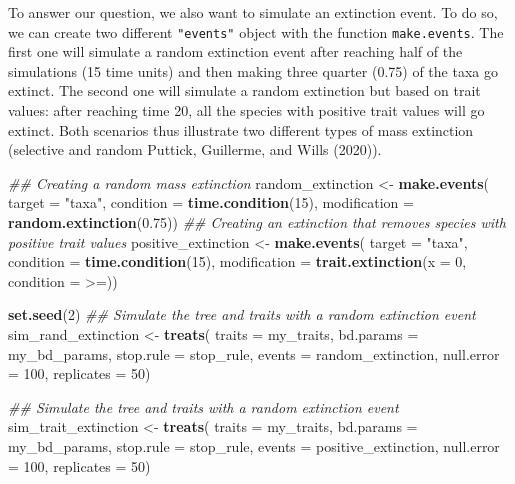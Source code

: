 \documentclass[
]{article}
\newenvironment{Shaded}{\begin{snugshade}}{\end{snugshade}}
\newcommand{\CommentTok}[1]{\textcolor[rgb]{0.56,0.35,0.01}{\textit{#1}}}
\newcommand{\DataTypeTok}[1]{\textcolor[rgb]{0.13,0.29,0.53}{#1}}
\newcommand{\DecValTok}[1]{\textcolor[rgb]{0.00,0.00,0.81}{#1}}
\newcommand{\FloatTok}[1]{\textcolor[rgb]{0.00,0.00,0.81}{#1}}
\newcommand{\KeywordTok}[1]{\textcolor[rgb]{0.13,0.29,0.53}{\textbf{#1}}}
\newcommand{\NormalTok}[1]{#1}
\newcommand{\StringTok}[1]{\textcolor[rgb]{0.31,0.60,0.02}{#1}}
\begin{document}
To answer our question, we also want to simulate an extinction event. To
do so, we can create two different \texttt{"events"} object with the
function \texttt{make.events}. The first one will simulate a random
extinction event after reaching half of the simulations (15 time units)
and then making three quarter (0.75) of the taxa go extinct. The second
one will simulate a random extinction but based on trait values: after
reaching time 20, all the species with positive trait values will go
extinct. Both scenarios thus illustrate two different types of mass
extinction (selective and random Puttick, Guillerme, and Wills (2020)).

\begin{Shaded}
\begin{Highlighting}[]
\CommentTok{\#\# Creating a random mass extinction}
\NormalTok{random\_extinction \textless{}{-}}\StringTok{ }\KeywordTok{make.events}\NormalTok{(}
    \DataTypeTok{target       =} \StringTok{"taxa"}\NormalTok{,}
    \DataTypeTok{condition    =} \KeywordTok{time.condition}\NormalTok{(}\DecValTok{15}\NormalTok{),}
    \DataTypeTok{modification =} \KeywordTok{random.extinction}\NormalTok{(}\FloatTok{0.75}\NormalTok{))}
\CommentTok{\#\# Creating an extinction that removes species with positive trait values}
\NormalTok{positive\_extinction \textless{}{-}}\StringTok{ }\KeywordTok{make.events}\NormalTok{(}
    \DataTypeTok{target =} \StringTok{"taxa"}\NormalTok{,}
    \DataTypeTok{condition =} \KeywordTok{time.condition}\NormalTok{(}\DecValTok{15}\NormalTok{),}
    \DataTypeTok{modification =} \KeywordTok{trait.extinction}\NormalTok{(}\DataTypeTok{x =} \DecValTok{0}\NormalTok{, }\DataTypeTok{condition =} \StringTok{\textasciigrave{}}\DataTypeTok{\textgreater{}=}\StringTok{\textasciigrave{}}\NormalTok{))}

\KeywordTok{set.seed}\NormalTok{(}\DecValTok{2}\NormalTok{)}
\CommentTok{\#\# Simulate the tree and traits with a random extinction event}
\NormalTok{sim\_rand\_extinction \textless{}{-}}\StringTok{ }\KeywordTok{treats}\NormalTok{(}
                   \DataTypeTok{traits     =}\NormalTok{ my\_traits,}
                   \DataTypeTok{bd.params  =}\NormalTok{ my\_bd\_params,}
                   \DataTypeTok{stop.rule  =}\NormalTok{ stop\_rule,}
                   \DataTypeTok{events     =}\NormalTok{ random\_extinction,}
                   \DataTypeTok{null.error =} \DecValTok{100}\NormalTok{,}
                   \DataTypeTok{replicates =} \DecValTok{50}\NormalTok{)}

\CommentTok{\#\# Simulate the tree and traits with a random extinction event}
\NormalTok{sim\_trait\_extinction \textless{}{-}}\StringTok{ }\KeywordTok{treats}\NormalTok{(}
                   \DataTypeTok{traits     =}\NormalTok{ my\_traits,}
                   \DataTypeTok{bd.params  =}\NormalTok{ my\_bd\_params,}
                   \DataTypeTok{stop.rule  =}\NormalTok{ stop\_rule,}
                   \DataTypeTok{events     =}\NormalTok{ positive\_extinction,}
                   \DataTypeTok{null.error =} \DecValTok{100}\NormalTok{,}
                   \DataTypeTok{replicates =} \DecValTok{50}\NormalTok{)}
\end{Highlighting}
\end{Shaded}
\end{document}
